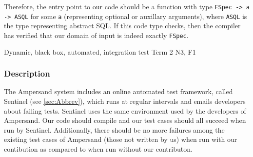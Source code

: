 \documentclass[12pt]{report}
\begin{document}
Therefore, the entry point to our code should be a function with type
\verb|FSpec -> a -> ASQL| for some \verb|a| (representing optional or auxillary
arguments), where \verb|ASQL| is the type representing abstract SQL. If this
code type checks, then the compiler has verified that our domain of input is
indeed exactly \verb|FSpec|.


{Dynamic, black box, automated, integration test}
{Term 2}
{N3, F1}
\vspace{-12pt}\subsubsection*{Description}

The Ampersand system includes an online automated test framework, called
Sentinel (see \ref{sec:Abbrev}), which runs at regular intervals and emails
developers about failing tests. Sentinel uses the same environment used by the
developers of Ampersand. Our code should compile and our test cases should all
succeed when run by Sentinel. Additionally, there should be no more failures
among the existing test cases of Ampersand (those not written by us) when run
with our contibution as compared to when run without our contributon. 
		
		
		

\end{document}
